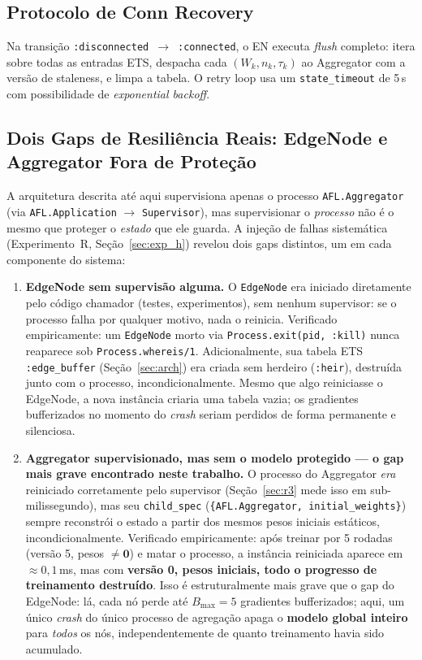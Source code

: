 \documentclass[conference,a4paper]{IEEEtran}
\begin{document}
\subsection{Protocolo de Conn Recovery}

Na transição \texttt{:disconnected}~$\rightarrow$~\texttt{:connected}, o EN
executa \textit{flush} completo: itera sobre todas as entradas ETS,
despacha cada $(W_k, n_k, \tau_k)$ ao Aggregator com a versão de staleness,
e limpa a tabela. O retry loop usa um \texttt{state\_timeout} de 5\,s com
possibilidade de \textit{exponential backoff}.

\subsection{Dois Gaps de Resiliência Reais: EdgeNode e Aggregator Fora de Proteção}
\label{sec:gap}

A arquitetura descrita até aqui supervisiona apenas o processo
\texttt{AFL.Aggregator} (via \texttt{AFL.Application} $\to$
\texttt{Supervisor}), mas supervisionar o \emph{processo} não é o mesmo
que proteger o \emph{estado} que ele guarda. A injeção de falhas
sistemática (Experimento~R, Seção~\ref{sec:exp_h}) revelou dois gaps
distintos, um em cada componente do sistema:

\begin{enumerate}[leftmargin=*,noitemsep]
  \item \textbf{EdgeNode sem supervisão alguma.} O \texttt{EdgeNode} era
    iniciado diretamente pelo código chamador (testes, experimentos), sem
    nenhum supervisor: se o processo falha por qualquer motivo, nada o
    reinicia. Verificado empiricamente: um \texttt{EdgeNode} morto via
    \texttt{Process.exit(pid, :kill)} nunca reaparece sob
    \texttt{Process.whereis/1}. Adicionalmente, sua tabela ETS
    \texttt{:edge\_buffer} (Seção~\ref{sec:arch}) era criada sem herdeiro
    (\texttt{:heir}), destruída junto com o processo, incondicionalmente.
    Mesmo que algo reiniciasse o EdgeNode, a nova instância criaria uma
    tabela vazia; os gradientes bufferizados no momento do \textit{crash}
    seriam perdidos de forma permanente e silenciosa.
  \item \textbf{Aggregator supervisionado, mas sem o modelo protegido ---
    o gap mais grave encontrado neste trabalho.} O processo do Aggregator
    \emph{era} reiniciado corretamente pelo supervisor (Seção~\ref{sec:r3}
    mede isso em sub-milissegundo), mas seu \texttt{child\_spec}
    (\texttt{\{AFL.Aggregator, initial\_weights\}}) sempre reconstrói o
    estado a partir dos mesmos pesos iniciais estáticos, incondicionalmente.
    Verificado empiricamente: após treinar por 5 rodadas (versão 5, pesos
    $\neq \mathbf{0}$) e matar o processo, a instância reiniciada aparece
    em $\approx0{,}1$\,ms, mas com \textbf{versão 0, pesos iniciais,
    todo o progresso de treinamento destruído}. Isso é estruturalmente mais
    grave que o gap do EdgeNode: lá, cada nó perde até $B_{\max}=5$
    gradientes bufferizados; aqui, um único \textit{crash} do único
    processo de agregação apaga o \textbf{modelo global inteiro} para
    \emph{todos} os nós, independentemente de quanto treinamento havia
    sido acumulado.
\end{enumerate}
\end{document}
